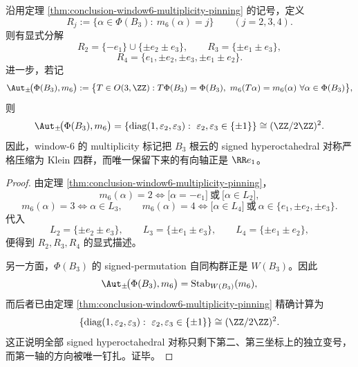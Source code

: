 \begin{corollary}\label{cor:conclusion-window6-signed-weyl-collapse}
沿用定理 \ref{thm:conclusion-window6-multiplicity-pinning} 的记号，定义
\[
R_j:=\{\alpha\in \Phi(B_3):\ m_6(\alpha)=j\}
\qquad (j=2,3,4).
\]
则有显式分解
\[
R_2=\{-e_1\}\cup\{\pm e_2\pm e_3\},
\qquad
R_3=\{\pm e_1\pm e_3\},
\]
\[
R_4=\{e_1,\pm e_2,\pm e_3,\pm e_1\pm e_2\}.
\]
进一步，若记
\[
\Aut_{\pm}\!\bigl(\Phi(B_3),m_6\bigr)
:=
\bigl\{
T\in O(3,\ZZ):
T\Phi(B_3)=\Phi(B_3),\ 
m_6(T\alpha)=m_6(\alpha)\ \forall \alpha\in\Phi(B_3)
\bigr\},
\]
则
\[
\Aut_{\pm}\!\bigl(\Phi(B_3),m_6\bigr)
=
\left\{
\operatorname{diag}(1,\varepsilon_2,\varepsilon_3):\ \varepsilon_2,\varepsilon_3\in\{\pm1\}
\right\}
\cong (\ZZ/2\ZZ)^2.
\]
因此，window-\(6\) 的 multiplicity 标记把 \(B_3\) 根云的 signed hyperoctahedral 对称严格压缩为 Klein 四群，而唯一保留下来的有向轴正是 \(\RR e_1\)。
\end{corollary}
\begin{proof}
由定理 \ref{thm:conclusion-window6-multiplicity-pinning}，
\[
m_6(\alpha)=2
\iff
\bigl[\alpha=-e_1\bigr]\ \text{或}\ \bigl[\alpha\in L_2\bigr],
\]
\[
m_6(\alpha)=3
\iff
\alpha\in L_3,
\qquad
m_6(\alpha)=4
\iff
\bigl[\alpha\in L_4\bigr]\ \text{或}\ \alpha\in\{e_1,\pm e_2,\pm e_3\}.
\]
代入
\[
L_2=\{\pm e_2\pm e_3\},
\qquad
L_3=\{\pm e_1\pm e_3\},
\qquad
L_4=\{\pm e_1\pm e_2\},
\]
便得到 \(R_2,R_3,R_4\) 的显式描述。

另一方面，\(\Phi(B_3)\) 的 signed-permutation 自同构群正是 \(W(B_3)\)。因此
\[
\Aut_{\pm}\!\bigl(\Phi(B_3),m_6\bigr)=\operatorname{Stab}_{W(B_3)}(m_6),
\]
而后者已由定理 \ref{thm:conclusion-window6-multiplicity-pinning} 精确计算为
\[
\left\{
\operatorname{diag}(1,\varepsilon_2,\varepsilon_3):\ \varepsilon_2,\varepsilon_3\in\{\pm1\}
\right\}
\cong (\ZZ/2\ZZ)^2.
\]
这正说明全部 signed hyperoctahedral 对称只剩下第二、第三坐标上的独立变号，而第一轴的方向被唯一钉扎。证毕。
\end{proof}

